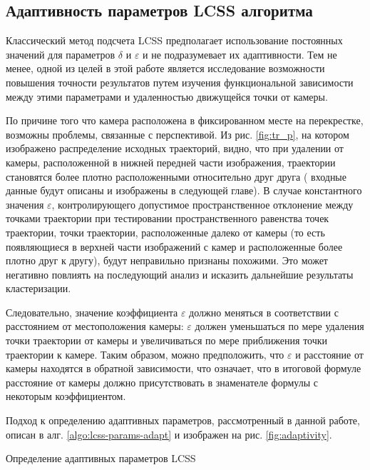 \subsection{Адаптивность параметров LCSS алгоритма}

Классический метод подсчета LCSS предполагает использование постоянных значений для параметров $\delta$ и $\varepsilon$ и не подразумевает их адаптивности. Тем не менее, одной из целей в этой работе является исследование возможности повышения точности результатов путем изучения функциональной зависимости между этими параметрами и удаленностью движущейся точки от камеры.

По причине того что камера расположена в фиксированном месте на перекрестке, возможны проблемы, связанные с перспективой. Из рис. \ref{fig:tr_p}, на котором изображено распределение исходных траекторий, видно, что при удалении от камеры, расположенной в нижней передней части изображения, траектории становятся более плотно расположенными относительно друг друга ( входные данные будут описаны и изображены в следующей главе). В случае константного значения $\varepsilon$, контролирующего допустимое пространственное отклонение между точками траектории при тестировании пространственного равенства точек траектории, точки траектории, расположенные далеко от камеры (то есть появляющиеся в верхней части изображений с камер и расположенные более плотно друг к другу), будут неправильно признаны похожими. Это может негативно повлиять на последующий анализ и исказить дальнейшие результаты кластеризации.

Следовательно, значение коэффициента $\varepsilon$ должно меняться в соответствии с расстоянием от местоположения камеры: $\varepsilon$ должен уменьшаться по мере удаления точки траектории от камеры и увеличиваться по мере приближения точки траектории к камере. Таким образом, можно предположить, что $\varepsilon$ и расстояние от камеры находятся в обратной зависимости, что означает, что в итоговой формуле расстояние от камеры должно присутствовать в знаменателе формулы с некоторым коэффициентом.

Подход к определению адаптивных параметров, рассмотренный в данной работе, описан в алг. \ref{algo:lcss-params-adapt} и изображен на рис. \ref{fig:adaptivity}.

\begin{algorithm}[!htb]
	\caption{Определение адаптивных параметров LCSS}
	\label{algo:lcss-params-adapt}
	\SetAlgoLined
\end{algorithm}

